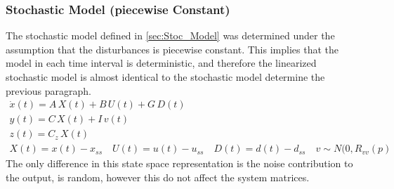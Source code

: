 \subsubsection{Stochastic Model (piecewise Constant)}
The stochastic model defined in \cref{sec:Stoc_Model} was determined under the assumption that the disturbances is piecewise constant. This implies that the model in each time interval is deterministic, and therefore the linearized stochastic model is almost identical to the stochastic model determine the previous paragraph.
\begin{equation}
    \begin{gathered}
        \dot{x}(t)=A\,X(t)+B\,U(t)+G\,D(t)\\
        y(t)=C\,X(t)+I\,v(t)\\
        z(t)=C_z\,X(t)\\
        X(t)=x(t)-x_{ss} \quad U(t)=u(t)-u_{ss} \quad D(t)=d(t)-d_{ss} \quad v\sim N(0,R_{vv}(p)
    \end{gathered}
\end{equation}
The only difference in this state space representation is the noise contribution to the output, is random, however this do not affect the system matrices. 
